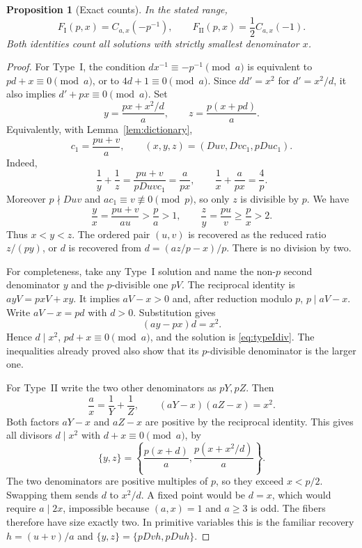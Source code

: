 \documentclass[11pt]{article}
\newtheorem{proposition}[theorem]{Proposition}
\theoremstyle{remark}\newtheorem{remark}[theorem]{Remark}
\newcommand{\FI}{F_{\mathrm I}}
\newcommand{\FII}{F_{\mathrm {II}}}
\begin{document}
\begin{proposition}[Exact counts]\label{prop:exact}
In the stated range,
\begin{equation}\label{eq:exact}
 \FI(p,x)=C_{a,x}(-p^{-1}),\qquad
 \FII(p,x)=\frac12 C_{a,x}(-1).
\end{equation}
Both identities count all solutions with strictly smallest denominator $x$.
\end{proposition}
\begin{proof}
For Type~I, the condition $d x^{-1}\equiv-p^{-1}\pmod a$ is equivalent
to $pd+x\equiv0\pmod a$, or to $4d+1\equiv0\pmod a$.
Since $dd'=x^2$ for $d'=x^2/d$, it also implies
$d'+px\equiv0\pmod a$. Set
\begin{equation}\label{eq:typeIdiv}
 y=\frac{px+x^2/d}{a},\qquad z=\frac{p(x+pd)}{a}.
\end{equation}
Equivalently, with Lemma~\ref{lem:dictionary},
\begin{equation}\label{eq:typeIpair}
 c_1=\frac{pu+v}{a},\qquad
 (x,y,z)=(Duv,Dv c_1,pDu c_1).
\end{equation}
Indeed,
\[
 \frac1y+\frac1z=\frac{pu+v}{pDuvc_1}=\frac a{px},
 \qquad \frac1x+\frac a{px}=\frac4p.
\]
Moreover $p\nmid Duv$ and
$ac_1\equiv v\not\equiv0\pmod p$, so only $z$ is divisible by $p$.
We have
\[
 \frac yx=\frac{pu+v}{au}>\frac pa>1,\qquad
 \frac zy=\frac{pu}{v}\ge\frac p x>2.
\]
Thus $x<y<z$. The ordered pair $(u,v)$ is recovered as the reduced ratio
$z/(py)$, or $d$ is recovered from $d=(az/p-x)/p$.
There is no division by two.

For completeness, take any Type~I solution and name the non-$p$ second
denominator $y$ and the $p$-divisible one $pV$.
The reciprocal identity is
$a y V=pxV+xy$. It implies $aV-x>0$ and, after reduction modulo $p$,
$p\mid aV-x$. Write $aV-x=pd$ with $d>0$. Substitution gives
\[
 (ay-px)d=x^2.
\]
Hence $d\mid x^2$, $pd+x\equiv0\pmod a$, and the solution is
\eqref{eq:typeIdiv}. The inequalities already proved also show that its
$p$-divisible denominator is the larger one.

For Type~II write the two other denominators as $pY,pZ$. Then
\[
 \frac ax=\frac1Y+\frac1Z,\qquad
 (aY-x)(aZ-x)=x^2.
\]
Both factors $aY-x$ and $aZ-x$ are positive by the reciprocal
identity. This gives all divisors $d\mid x^2$ with $d+x\equiv0\pmod a$, by
\begin{equation}\label{eq:typeIIdiv}
 \{y,z\}=
 \left\{\frac{p(x+d)}a,\frac{p(x+x^2/d)}a\right\}.
\end{equation}
The two denominators are positive multiples of $p$, so they exceed
$x<p/2$. Swapping them sends $d$ to $x^2/d$. A fixed point would be
$d=x$, which would require $a\mid2x$, impossible because $(a,x)=1$
and $a\ge3$ is odd. The fibers therefore have size exactly two.
In primitive variables this is the familiar recovery
$h=(u+v)/a$ and $\{y,z\}=\{pDvh,pDuh\}$.
\end{proof}
\end{document}
